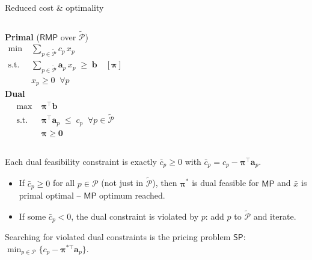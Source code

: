 \documentclass[10pt,aspectratio=169]{beamer}
\newcommand{\rmp}{\mathsf{RMP}}
\newcommand{\masterp}{\mathsf{MP}}
\newcommand{\sub}{\mathsf{SP}}
\newcommand{\redcost}{\bar{c}}
\begin{document}
\begin{frame}{Reduced cost \& optimality}
  \begin{columns}[T,onlytextwidth]
    \textbf{Primal} ($\rmp$ over $\widetilde{\mathcal P}$)
    \begin{align*}
      \min\;& \sum_{p\in\widetilde{\mathcal P}} c_p\, x_p \\
      \text{s.t.}\;& \sum_{p\in\widetilde{\mathcal P}} \mathbf a_p\, x_p \;\ge\; \mathbf b
                     \quad [\boldsymbol\pi]\\
      & x_p \ge 0 \;\;\forall p
    \end{align*}
    \textbf{Dual}
    \begin{align*}
      \max\;& \boldsymbol\pi^{\!\top} \mathbf b \\
      \text{s.t.}\;& \boldsymbol\pi^{\!\top} \mathbf a_p \;\le\; c_p
                     \;\;\forall p\in\widetilde{\mathcal P} \\
      & \boldsymbol\pi \ge \mathbf 0
    \end{align*}
  \end{columns}
  \medskip

  Each dual feasibility constraint is exactly $\redcost_p\ge 0$ with
  $\redcost_p = c_p - \boldsymbol\pi^{\!\top}\mathbf a_p$.
  \begin{itemize}\small
    \item If $\redcost_p\ge 0$ for \alert{all} $p\in\mathcal P$ (not just in
          $\widetilde{\mathcal P}$), then $\boldsymbol\pi^*$ is dual feasible
          for $\masterp$ and $\bar x$ is primal optimal -- $\masterp$ optimum
          reached.
    \item If some $\redcost_p<0$, the dual constraint is violated by $p$:
          add $p$ to $\widetilde{\mathcal P}$ and iterate.
  \end{itemize}
  Searching for violated dual constraints is the pricing problem $\sub$:
  $\min_{p\in\mathcal P} \big\{c_p - \boldsymbol\pi^{*\top}\mathbf a_p\big\}$.
\end{frame}
\end{document}
